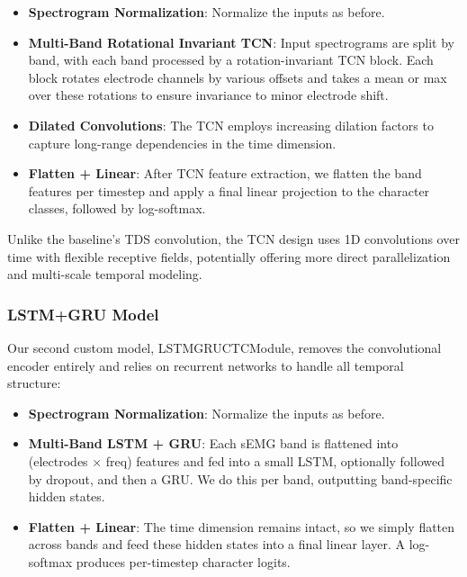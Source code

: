 \begin{itemize}
    \item\textbf{Spectrogram Normalization}: Normalize the inputs as before.

    \item\textbf{Multi-Band Rotational Invariant TCN}: Input spectrograms are split by band, with each band processed by a rotation-invariant TCN block. Each block rotates electrode channels by various offsets and takes a mean or max over these rotations to ensure invariance to minor electrode shift.

    \item\textbf{Dilated Convolutions}: The TCN employs increasing dilation factors to capture long-range dependencies in the time dimension.
    
    \item\textbf{Flatten + Linear}: After TCN feature extraction, we flatten the band features per timestep and apply a final linear projection to the character classes, followed by log-softmax.
\end{itemize}

Unlike the baseline’s TDS convolution, the TCN design uses 1D convolutions over time with flexible receptive fields, potentially offering more direct parallelization and multi-scale temporal modeling.

\subsubsection{LSTM+GRU Model}

Our second custom model, LSTMGRUCTCModule, removes the convolutional encoder entirely and relies on recurrent networks to handle all temporal structure:
\begin{itemize}
    \item\textbf{Spectrogram Normalization}: Normalize the inputs as before.

    \item \textbf{Multi-Band LSTM + GRU}: Each sEMG band is flattened into (electrodes × freq) features and fed into a small LSTM, optionally followed by dropout, and then a GRU. We do this per band, outputting band-specific hidden states.

    \item \textbf{Flatten + Linear}: The time dimension remains intact, so we simply flatten across bands and feed these hidden states into a final linear layer. A log-softmax produces per-timestep character logits.
\end{itemize}

